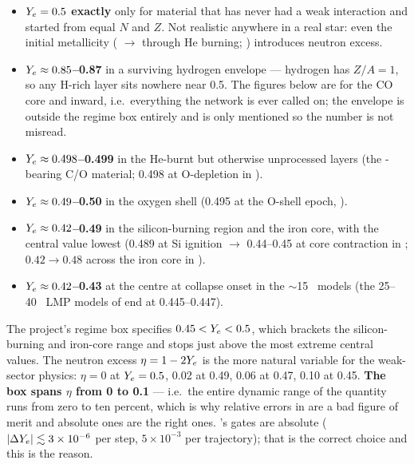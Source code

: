 \begin{itemize}
\item \textbf{$Y_{e} = 0.5$ exactly} only for material that has never had a weak
  interaction and started from equal $N$ and $Z$. Not realistic anywhere in a
  real star: even the initial metallicity ( $\to$ 
  through He burning; \citealt{woosley2007}) introduces neutron excess.
\item \textbf{$Y_{e} \approx 0.85$--0.87} in a surviving hydrogen envelope ---
  hydrogen has $Z/A = 1$, so any H-rich layer sits nowhere near 0.5. The
  figures below are for the CO core and inward, i.e.\ everything the network
  is ever called on; the envelope is outside the regime box entirely and is
  only mentioned so the number is not misread.
\item \textbf{$Y_{e} \approx 0.498$--0.499} in the He-burnt but otherwise
  unprocessed layers (the -bearing C/O material; 0.498 at
  O-depletion in \citealt{heger2001}).
\item \textbf{$Y_{e} \approx 0.49$--0.50} in the oxygen shell (0.495 at the
  O-shell epoch, \citealt{heger2001}).
\item \textbf{$Y_{e} \approx 0.42$--0.49} in the silicon-burning region and the
  iron core, with the central value lowest (0.489 at Si ignition $\to$
  0.44--0.45 at core contraction in \citealt{heger2001}; $0.42 \to 0.48$
  across the iron core in \citealt{timmes1996}).
\item \textbf{$Y_{e} \approx 0.42$--0.43} at the centre at collapse onset in the
  $\sim$15~\Msun{} models (the 25--40~\Msun{} LMP models of \citealt{heger2001}
  end at 0.445--0.447).
\end{itemize}

The project's regime box specifies \textbf{$0.45 < Y_{e} < 0.5$}, which brackets
the silicon-burning and iron-core range and stops just above the most extreme
central values. The neutron excess $\eta = 1 - 2Y_{e}$ is the more natural
variable for the weak-sector physics: $\eta = 0$ at $Y_{e} = 0.5$, 0.02 at 0.49,
0.06 at 0.47, 0.10 at 0.45. \textbf{The box spans $\eta$ from 0 to 0.1} ---
i.e.\ the entire dynamic range of the quantity runs from zero to ten percent,
which is why relative errors in \Ye{} are a bad figure of merit and absolute
ones are the right ones. 's gates are absolute
($|\Delta Y_{e}| \lesssim 3 \times 10^{-6}$ per step, $5 \times 10^{-3}$ per
trajectory); that is the correct choice and this is the reason.

